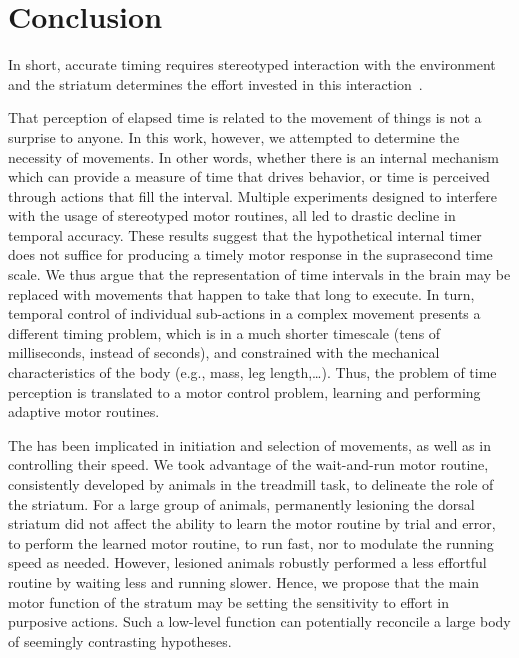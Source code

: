 \section{Conclusion} \label{ch:discussion:conclusion}

In short, accurate timing requires stereotyped interaction with the environment and the striatum determines the effort invested in this interaction~\cite{Safaie2020PNAS,JuradoParras2020}.
\par
That perception of elapsed time is related to the movement of things is not a surprise to anyone.
In this work, however, we attempted to determine the necessity of movements.
In other words, whether there is an internal mechanism which can provide a measure of time that drives behavior, or time is perceived through actions that fill the interval.
Multiple experiments designed to interfere with the usage of stereotyped motor routines, all led to drastic decline in temporal accuracy.
These results suggest that the hypothetical internal timer does not suffice for producing a timely motor response in the suprasecond time scale.
We thus argue that the representation of time intervals in the brain may be replaced with movements that happen to take that long to execute.
In turn, temporal control of individual sub-actions in a complex movement presents a different timing problem, which is in a much shorter timescale (tens of milliseconds, instead of seconds), and constrained with the mechanical characteristics of the body (e.g., mass, leg length,\dots).
Thus, the problem of time perception is translated to a motor control problem, learning and performing adaptive motor routines.
\par
The  has been implicated in initiation and selection of movements, as well as in controlling their speed.
We took advantage of the wait-and-run motor routine, consistently developed by animals in the treadmill task, to delineate the role of the striatum.
For a large group of animals, permanently lesioning the dorsal striatum did not affect the ability to learn the motor routine by trial and error, to perform the learned motor routine, to run fast, nor to modulate the running speed as needed.
However, lesioned animals robustly performed a less effortful routine by waiting less and running slower.
Hence, we propose that the main motor function of the stratum may be setting the sensitivity to effort in purposive actions.
Such a low-level function can potentially reconcile a large body of seemingly contrasting hypotheses.
